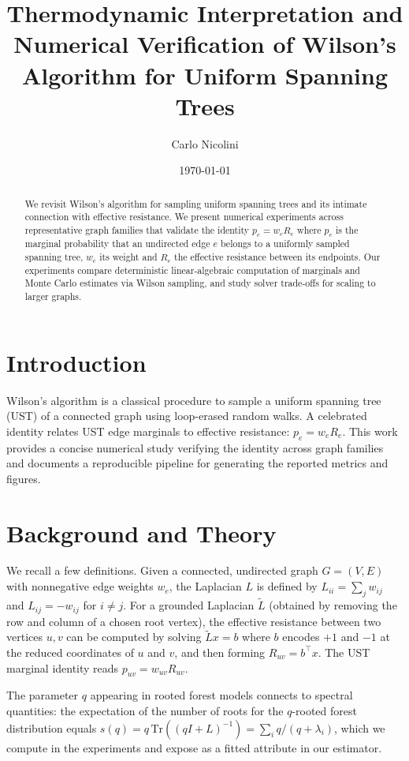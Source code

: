 \documentclass[10pt,aps,pre,twocolumn,nofootinbib,superscriptaddress,longbibliography]{revtex4-1}
\title{Thermodynamic Interpretation and Numerical Verification of Wilson's Algorithm for Uniform Spanning Trees}
\author{Carlo Nicolini}
\affiliation{Center for Neuroscience and Cognitive Systems, Istituto Italiano di Tecnologia}
\date{\today}
\begin{document}
\maketitle

\begin{abstract}
We revisit Wilson's algorithm for sampling uniform spanning trees and its
intimate connection with effective resistance. We present numerical
experiments across representative graph families that validate the identity
\(p_e = w_e R_e\) where $p_e$ is the marginal probability that an undirected
edge $e$ belongs to a uniformly sampled spanning tree, $w_e$ its weight and
$R_e$ the effective resistance between its endpoints. Our experiments compare
deterministic linear-algebraic computation of marginals and Monte Carlo
estimates via Wilson sampling, and study solver trade-offs for scaling to
larger graphs.
\end{abstract}

\section{Introduction}
Wilson's algorithm is a classical procedure to sample a uniform spanning tree
(UST) of a connected graph using loop-erased random walks. A celebrated
identity relates UST edge marginals to effective resistance: $p_e = w_e R_e$.
This work provides a concise numerical study verifying the identity across
graph families and documents a reproducible pipeline for generating the
reported metrics and figures.

\section{Background and Theory}
We recall a few definitions. Given a connected, undirected graph $G=(V,E)$
with nonnegative edge weights $w_e$, the Laplacian $L$ is defined by
$L_{ii} = \sum_j w_{ij}$ and $L_{ij} = -w_{ij}$ for $i\ne j$. For a grounded
Laplacian $\tilde L$ (obtained by removing the row and column of a chosen
root vertex), the effective resistance between two vertices $u,v$ can be
computed by solving $\tilde L x = b$ where $b$ encodes $+1$ and $-1$ at the
reduced coordinates of $u$ and $v$, and then forming $R_{uv} = b^\top x$.
The UST marginal identity reads $p_{uv} = w_{uv} R_{uv}$.

The parameter $q$ appearing in rooted forest models connects to spectral
quantities: the expectation of the number of roots for the $q$-rooted forest
distribution equals $s(q) = q\,\mathrm{Tr}((qI + L)^{-1}) = \sum_i q/(q+\lambda_i)$,
which we compute in the experiments and expose as a fitted attribute in our
estimator.
\end{document}
